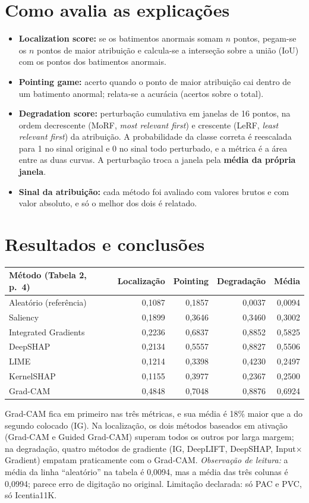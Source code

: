 \documentclass[11pt,a4paper]{article}
\begin{document}
\section{Como avalia as explicações}
\begin{itemize}
  \item \textbf{Localization score:} se os batimentos anormais somam $n$ pontos, pegam-se os $n$ pontos de maior atribuição e calcula-se a interseção sobre a união (IoU) com os pontos dos batimentos anormais.
  \item \textbf{Pointing game:} acerto quando o ponto de maior atribuição cai dentro de um batimento anormal; relata-se a acurácia (acertos sobre o total).
  \item \textbf{Degradation score:} perturbação cumulativa em janelas de 16 pontos, na ordem decrescente (MoRF, \textit{most relevant first}) e crescente (LeRF, \textit{least relevant first}) da atribuição. A probabilidade da classe correta é reescalada para 1 no sinal original e 0 no sinal todo perturbado, e a métrica é a área entre as duas curvas. A perturbação troca a janela pela \textbf{média da própria janela}.
  \item \textbf{Sinal da atribuição:} cada método foi avaliado com valores brutos e com valor absoluto, e só o melhor dos dois é relatado.
\end{itemize}

\section{Resultados e conclusões}
\begin{center}
\small
\begin{tabular}{lrrrr}
\toprule
Método (Tabela 2, p.~4) & Localização & Pointing & Degradação & Média \\
\midrule
Aleatório (referência) & 0,1087 & 0,1857 & 0,0037 & 0,0094 \\
Saliency & 0,1899 & 0,3646 & 0,3460 & 0,3002 \\
Integrated Gradients & 0,2236 & 0,6837 & 0,8852 & 0,5825 \\
DeepSHAP & 0,2134 & 0,5557 & 0,8827 & 0,5506 \\
LIME & 0,1214 & 0,3398 & 0,4230 & 0,2497 \\
KernelSHAP & 0,1155 & 0,3977 & 0,2367 & 0,2500 \\
Grad-CAM & 0,4848 & 0,7048 & 0,8876 & 0,6924 \\
\bottomrule
\end{tabular}
\end{center}
Grad-CAM fica em primeiro nas três métricas, e sua média é 18\% maior que a do segundo colocado (IG). Na localização, os dois métodos baseados em ativação (Grad-CAM e Guided Grad-CAM) superam todos os outros por larga margem; na degradação, quatro métodos de gradiente (IG, DeepLIFT, DeepSHAP, Input$\times$Gradient) empatam praticamente com o Grad-CAM. \textit{Observação de leitura:} a média da linha “aleatório” na tabela é 0,0094, mas a média das três colunas é 0,0994; parece erro de digitação no original. Limitação declarada: só PAC e PVC, só Icentia11K.
\end{document}
